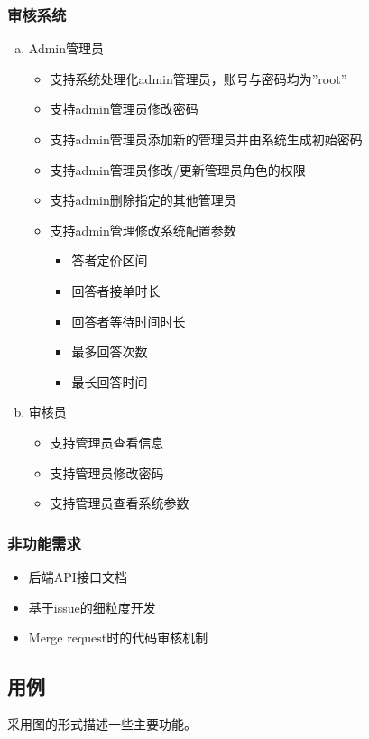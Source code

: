 \documentclass[12pt]{ctexart}
\begin{document}
\subsubsection{审核系统}
\begin{enumerate}[a)]
	\item  Admin管理员\begin{itemize}
		\item 支持系统处理化admin管理员，账号与密码均为”root”
		\item 支持admin管理员修改密码
		\item 支持admin管理员添加新的管理员并由系统生成初始密码
		\item 支持admin管理员修改/更新管理员角色的权限
		\item 支持admin删除指定的其他管理员
		\item 支持admin管理修改系统配置参数\begin{itemize}
			\item 答者定价区间
			\item 回答者接单时长
			\item 回答者等待时间时长
			\item 最多回答次数
			\item 最长回答时间
		\end{itemize}
	\end{itemize}
	\item 审核员\begin{itemize}
		\item 支持管理员查看信息
		\item 支持管理员修改密码
		\item 支持管理员查看系统参数
	\end{itemize}
\end{enumerate}
\subsubsection{非功能需求}
\begin{itemize}
	\item 后端API接口文档
	\item 基于issue的细粒度开发
	\item Merge request时的代码审核机制
\end{itemize}
\subsection{用例}
采用图的形式描述一些主要功能。
\end{document}
